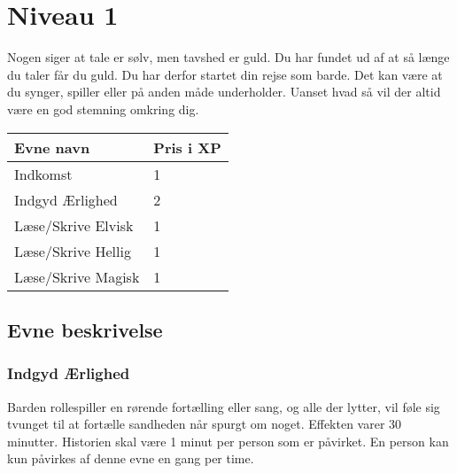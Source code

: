 \chapter*{Niveau 1}
Nogen siger at tale er sølv, men tavshed er guld. Du har fundet ud af at så længe du taler får du guld. Du har derfor startet din rejse som barde. Det kan være at du synger, spiller eller på anden måde underholder. Uanset hvad så vil der altid være en god stemning omkring dig.
\begin{table}[H]
    \centering
    \begin{tabular}{|p{}|p{}|}
    \rowcolor{cerulean!80}\hline
        Evne navn & Pris i XP \\\hline
         Indkomst & 1 \\\hline
         Indgyd Ærlighed & 2 \\\hline
         Læse/Skrive Elvisk & 1 \\\hline
         Læse/Skrive Hellig & 1 \\\hline
         Læse/Skrive Magisk & 1 \\\hline
    \end{tabular}
\end{table} 

\section*{Evne beskrivelse}

\subsection*{Indgyd Ærlighed}
Barden rollespiller en rørende fortælling eller sang, og alle der lytter, vil føle sig tvunget til at fortælle sandheden når spurgt om noget. Effekten varer 30 minutter. Historien skal være 1 minut per person som er påvirket. En person kan kun påvirkes af denne evne en gang per time.








